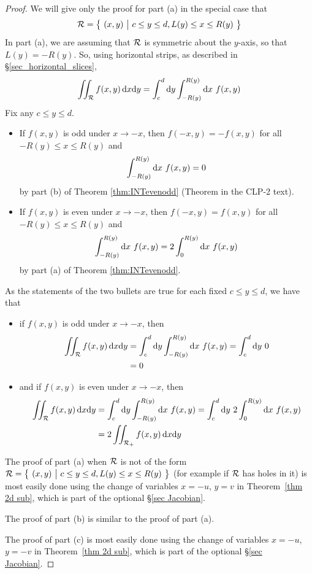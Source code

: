 \begin{proof}
We will give only the proof for part (a) in the special case that
\begin{equation*}
\mathcal{R}=\big\{ \ (x,y)\ \big|\ c\le y\le d, L(y)\le x\le R(y)\ \big\}
\end{equation*}
In part (a), we are assuming that $\mathcal{R}$ is symmetric about the $y$-axis,
so that $L(y)=-R(y)$. So, using horizontal strips, as described in 
\S\ref{sec_horizontal_slices},
\begin{equation*}
\iint_{\mathcal{R}} f(x,y)\,\mathrm{d}x\mathrm{d}y
=\int_c^d \mathrm{d}y \int_{-R(y)}^{R(y)} \mathrm{d}x\ f(x,y)
\end{equation*}  
Fix any $c\le y\le d$.
\begin{itemize}
\item
If $f(x,y)$ is odd under $x\rightarrow -x$, then
$f(-x,y)=-f(x,y)$ for all $-R(y)\le x\le R(y)$ and
\begin{equation*}
\int_{-R(y)}^{R(y)} \dee{x}\ f(x,y)=0
\end{equation*}
by part (b) of Theorem \ref{thm:INTevenodd} (Theorem  in the CLP-2 text).
\item
If $f(x,y)$ is even under $x\rightarrow -x$, then
$f(-x,y)=f(x,y)$ for all $-R(y)\le x\le R(y)$ and
\begin{equation*}
\int_{-R(y)}^{R(y)} \dee{x}\ f(x,y)=2\int_0^{R(y)} \dee{x}\ f(x,y)
\end{equation*}
by part (a) of Theorem \ref{thm:INTevenodd}.
\end{itemize}
As the statements of the two bullets are true for each fixed $c\le y\le d$,
we have that
\begin{itemize}
\item
if $f(x,y)$ is odd under $x\rightarrow -x$, then
\begin{align*}
\iint_{\mathcal{R}} f(x,y)\,\mathrm{d}x\mathrm{d}y
&=\int_c^d \mathrm{d}y \int_{-R(y)}^{R(y)} \mathrm{d}x\ f(x,y) 
=\int_c^d \mathrm{d}y\ 0 \\
&=0
\end{align*}
\item and if $f(x,y)$ is even under $x\rightarrow -x$, then
\begin{align*}
\iint_{\mathcal{R}} f(x,y)\,\mathrm{d}x\mathrm{d}y
&=\int_c^d \mathrm{d}y \int_{-R(y)}^{R(y)} \mathrm{d}x\ f(x,y)
=\int_c^d \mathrm{d}y\ 2\int_0^{R(y)} \mathrm{d}x\ f(x,y) \\
&=2\iint_{\mathcal{R}_+} f(x,y)\,\mathrm{d}x\mathrm{d}y
\end{align*}
\end{itemize}
The proof of part (a) when $\mathcal{R}$ is not of the form 
$\mathcal{R}=\big\{ \ (x,y)\ \big|\ c\le y\le d, L(y)\le x\le R(y)\ \big\}$ (for example if $\mathcal{R}$ 
has holes in it) is most easily done using the change of variables
$x=-u$, $y=v$ in Theorem~\ref{thm 2d sub}, which is part of the optional \S\ref{sec Jacobian}.

The proof of part (b) is similar to the proof of part (a).

The proof of part (c) is most easily done using the change of variables
$x=-u$, $y=-v$ in Theorem~\ref{thm 2d sub}, which is part of the optional \S\ref{sec Jacobian}.
\end{proof}

